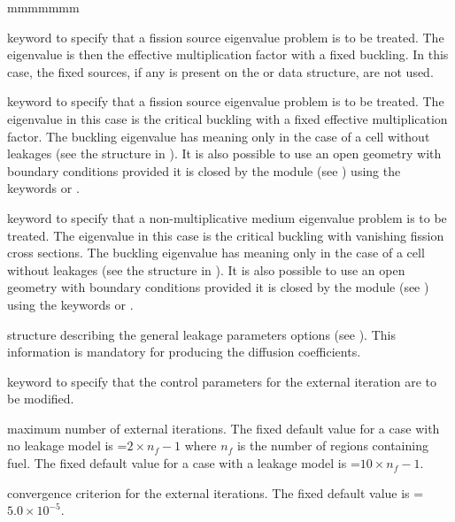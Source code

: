 \begin{ListeDeDescription}{mmmmmmm}
\item[\moc{K}] keyword to specify that a fission source eigenvalue problem is
to be treated. The eigenvalue is then the effective multiplication factor with a
fixed buckling. In this case, the fixed sources, if any is present on the
 or  data structure, are not used.  

\item[\moc{B}] keyword to specify that a fission source eigenvalue problem is
to be treated. The eigenvalue in this case is the critical buckling with a fixed
effective multiplication factor. The buckling eigenvalue has meaning only in the
case of a cell without leakages (see the structure  in
). It is also possible to use an open geometry with
 boundary conditions  provided it is closed by the  module
(see ) using the keywords  or .

\item[\moc{L}] keyword to specify that a non-multiplicative medium eigenvalue
problem is to be treated. The eigenvalue in this case is the critical buckling
with vanishing fission cross sections. The buckling eigenvalue has meaning only in the
case of a cell without leakages (see the structure  in
). It is also possible to use an open geometry with
 boundary conditions  provided it is closed by the  module
(see ) using the keywords  or .

\item[\dstr{descleak}] structure describing the general leakage parameters
options (see ). This information is mandatory for producing the
diffusion coefficients.

\item[\moc{EXTE}] keyword to specify that the control parameters for the
external iteration are to be modified. 

\item[\dusa{maxout}] maximum number of external iterations. The fixed default
value for a case with no leakage model is =$2\times n_{f}-1$ where
$n_{f}$ is the number of regions containing fuel. The fixed default value for a
case with a leakage model is =$10\times n_{f}-1$.

\item[\dusa{epsout}] convergence criterion for the external iterations. The
fixed default value is =$5.0\times 10^{-5}$.


\end{ListeDeDescription}
